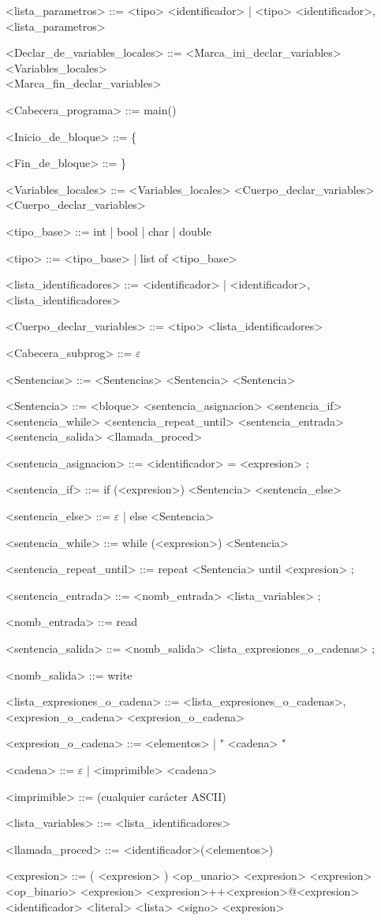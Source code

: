 \documentclass{scrartcl}
\begin{document}
\begin{grammar}
<lista_parametros> ::= <tipo> <identificador> | <tipo> <identificador>, <lista_parametros>

<Declar_de_variables_locales> ::= <Marca_ini_declar_variables> \\
<Variables_locales> \\
<Marca_fin_declar_variables>

<Cabecera_programa> ::= main()

<Inicio_de_bloque> ::= \{

<Fin_de_bloque> ::= \}

<Variables_locales> ::= <Variables_locales> <Cuerpo_declar_variables>
\alt <Cuerpo_declar_variables>

<tipo_base> ::= int | bool | char | double

<tipo> ::= <tipo_base> | list of <tipo_base>

<lista_identificadores> ::= <identificador> | <identificador>, <lista_identificadores>

<Cuerpo_declar_variables> ::= <tipo> <lista_identificadores>

<Cabecera_subprog> ::= $\varepsilon$

<Sentencias> ::= <Sentencias> <Sentencia>
\alt <Sentencia>

<Sentencia> ::= <bloque>
\alt <sentencia_asignacion>
\alt <sentencia_if>
\alt <sentencia_while>
\alt <sentencia_repeat_until>
\alt <sentencia_entrada>
\alt <sentencia_salida>
\alt <llamada_proced>

<sentencia_asignacion> ::=  <identificador> = <expresion> ;

<sentencia_if> ::= if (<expresion>) <Sentencia> <sentencia_else>

<sentencia_else> ::= $\varepsilon$ | else <Sentencia>

<sentencia_while> ::= while (<expresion>) <Sentencia>

<sentencia_repeat_until> ::= repeat <Sentencia> until <expresion> ;

<sentencia_entrada> ::= <nomb_entrada> <lista_variables> ;

<nomb_entrada> ::= read

<sentencia_salida> ::= <nomb_salida> <lista_expresiones_o_cadenas> ;

<nomb_salida> ::= write

<lista_expresiones_o_cadena> ::= <lista_expresiones_o_cadenas>, <expresion_o_cadena>
\alt <expresion_o_cadena>

<expresion_o_cadena> ::= <elementos> | " <cadena> "

<cadena> ::= $\varepsilon$ | <imprimible> <cadena>

<imprimible> ::= (cualquier carácter ASCII)

<lista_variables> ::= <lista_identificadores>

<llamada_proced> ::= <identificador>(<elementos>)

<expresion> ::= ( <expresion> )
\alt <op_unario> <expresion>
\alt <expresion> <op_binario> <expresion>
\alt <expresion>++<expresion>@<expresion>
\alt <identificador>
\alt <literal>
\alt <lista>
\alt <signo> <expresion>

\end{grammar}
\end{document}
